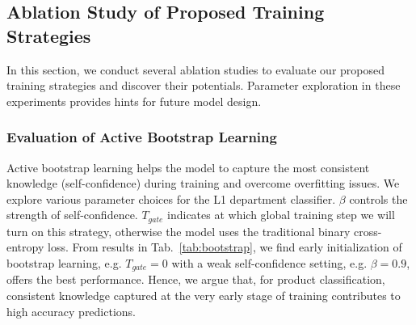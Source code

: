 \documentclass[11pt,dvipsnames]{article}
\begin{document}
\begin{table}[]
    \centering
    \caption{Comparison with DNN baseline model for department/leaf classification in L2 data.}
    \label{tab:SE_results}
\end{table}




\subsection{Ablation Study of Proposed Training Strategies}
In this section, we conduct several ablation studies to evaluate our proposed training strategies and discover their potentials. Parameter exploration in these experiments provides hints for future model design.

\subsubsection{Evaluation of Active Bootstrap Learning}
Active bootstrap learning helps the model to capture the most consistent knowledge (self-confidence) during training and overcome overfitting issues. We explore various parameter choices for the L1 department classifier. $\beta$ controls the strength of self-confidence. $T_{gate}$ indicates at which global training step we will turn on this strategy, otherwise the model uses the traditional binary cross-entropy loss. From results in Tab.~\ref{tab:bootstrap}, we find early initialization of bootstrap learning, e.g. $T_{gate}=0$ with a weak self-confidence setting, e.g. $\beta=0.9$, offers the best performance. Hence, we argue that, for product classification, consistent knowledge captured at the very early stage of training contributes to high accuracy predictions.
\end{document}
